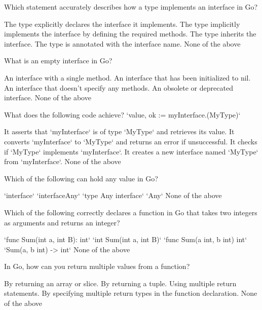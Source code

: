 \documentclass[12pt]{exam}
\begin{document}
\begin{questions}
\question[2]  Which statement accurately describes how a type implements an interface in Go?
\begin{choices}
\choice  The type explicitly declares the interface it implements.
\CorrectChoice  The type implicitly implements the interface by defining the required methods.
\choice  The type inherits the interface.
\choice  The type is annotated with the interface name.
\choice  None of the above
\end{choices}
 
\question[2]  What is an empty interface in Go?
\begin{choices}
\choice  An interface with a single method.
\choice  An interface that has been initialized to nil.
\CorrectChoice  An interface that doesn't specify any methods.
\choice  An obsolete or deprecated interface.
\choice  None of the above
\end{choices}
 
\question[2]  What does the following code achieve? `value, ok := myInterface.(MyType)`
\begin{choices}
\CorrectChoice  It asserts that `myInterface` is of type `MyType` and retrieves its value.
\choice  It converts `myInterface` to `MyType` and returns an error if unsuccessful.
\choice  It checks if `MyType` implements `myInterface`.
\choice  It creates a new interface named `MyType` from `myInterface`.
\choice  None of the above
\end{choices}
 
\question[2]  Which of the following can hold any value in Go?
\begin{choices}
\CorrectChoice  `interface{}`
\choice  `interface{Any}`
\choice  `type Any interface{}`
\choice  `Any`
\choice  None of the above
\end{choices}
 
\question[2]  Which of the following correctly declares a function in Go that takes two integers as arguments and returns an integer?
\begin{choices}
\choice  `func Sum(int a, int B): int`
\choice  `int Sum(int a, int B)`
\CorrectChoice  `func Sum(a int, b int) int`
\choice  `Sum(a, b int) -> int`
\choice  None of the above
\end{choices}
 
\question[2]  In Go, how can you return multiple values from a function?
\begin{choices}
\choice  By returning an array or slice.
\choice  By returning a tuple.
\choice  Using multiple return statements.
\CorrectChoice  By specifying multiple return types in the function declaration.
\choice  None of the above
\end{choices}
 

\end{questions}
\end{document}
